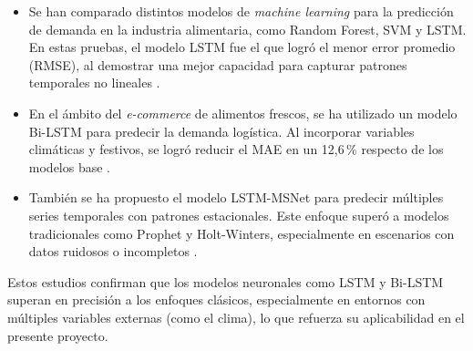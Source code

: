\begin{itemize}
    \item Se han comparado distintos modelos de \textit{machine learning} para la predicción de demanda en la industria alimentaria, como Random Forest, SVM y LSTM. En estas pruebas, el modelo LSTM fue el que logró el menor error promedio (RMSE), al demostrar una mejor capacidad para capturar patrones temporales no lineales \parencite{nassibi2023}.

    \item En el ámbito del \textit{e-commerce} de alimentos frescos, se ha utilizado un modelo Bi-LSTM para predecir la demanda logística. Al incorporar variables climáticas y festivos, se logró reducir el MAE en un 12{,}6\,\% respecto de los modelos base \parencite{ni2022}.

    \item También se ha propuesto el modelo LSTM-MSNet para predecir múltiples series temporales con patrones estacionales. Este enfoque superó a modelos tradicionales como Prophet y Holt-Winters, especialmente en escenarios con datos ruidosos o incompletos \parencite{bandara2020}.
\end{itemize}

Estos estudios confirman que los modelos neuronales como LSTM y Bi-LSTM superan en precisión a los enfoques clásicos, especialmente en entornos con múltiples variables externas (como el clima), lo que refuerza su aplicabilidad en el presente proyecto.



